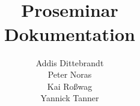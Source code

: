 \documentclass[ngerman,parskip=full]{article}
\title{
	\\ \Huge{\textbf{Proseminar}} 
	\\ [20pt] \huge{\textbf{Dokumentation}}}
\author{Addis Dittebrandt \\ Peter Noras \\ Kai Roßwag \\ Yannick Tanner}
\begin{document}
	
	\begin{titlepage}
		
		\maketitle
		\thispagestyle{empty}
		\newpage
		
	\end{titlepage}
	
	\tableofcontents 
	\newpage
	
	
	
\end{document}
